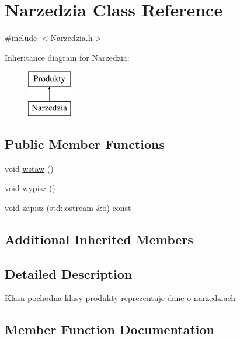 \hypertarget{class_narzedzia}{}\section{Narzedzia Class Reference}
\label{class_narzedzia}


{\ttfamily \#include $<$Narzedzia.\+h$>$}

Inheritance diagram for Narzedzia\+:\begin{figure}[H]
\begin{center}
\leavevmode
\includegraphics[height=2.000000cm]{class_narzedzia}
\end{center}
\end{figure}
\subsection*{Public Member Functions}
\begin{DoxyCompactItemize}
\item 
void \mbox{\hyperlink{class_narzedzia_ade1bd4ecf05c894b263791bfcf0f876f}{wstaw}} ()
\item 
void \mbox{\hyperlink{class_narzedzia_a39cd48d9367f3a4e8fcc30878a320338}{wypisz}} ()
\item 
void \mbox{\hyperlink{class_narzedzia_a4178a26508e00853e8c5c483f9a439a3}{zapisz}} (std\+::ostream \&o) const
\end{DoxyCompactItemize}
\subsection*{Additional Inherited Members}


\subsection{Detailed Description}
Klasa pochodna klasy produkty reprezentuje dane o narzedziach 

\subsection{Member Function Documentation}
\mbox{\label{class_narzedzia_ade1bd4ecf05c894b263791bfcf0f876f}} 

